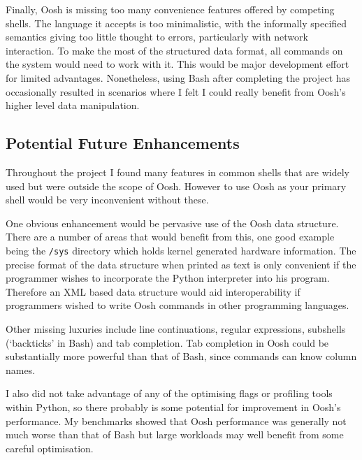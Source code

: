 \documentclass[12pt,twoside,notitlepage]{report}
\begin{document}
Finally, Oosh is missing too many convenience features offered by
competing shells. The language it accepts is too minimalistic, with
the informally specified semantics giving too little thought to
errors, particularly with network interaction. To make the most of the
structured data format, all commands on the system would need to work
with it. This would be major development effort for limited
advantages. Nonetheless, using Bash after completing the project has
occasionally resulted in scenarios where I felt I could really benefit
from Oosh's higher level data manipulation.

\subsection{Potential Future Enhancements}
Throughout the project I found many features in common shells that are
widely used but were outside the scope of Oosh. However to use Oosh as
your primary shell would be very inconvenient without these.

One obvious enhancement would be pervasive use of the Oosh data
structure. There are a number of areas that would benefit from this,
one good example being the {\tt /sys} directory which holds kernel
generated hardware information. The precise format of the data
structure when printed as text is only convenient if the programmer
wishes to incorporate the Python interpreter into his
program. Therefore an XML based data structure would aid
interoperability if programmers wished to write Oosh commands in other
programming languages.

Other missing luxuries include line continuations, regular
expressions, subshells (`backticks' in Bash) and tab completion. Tab
completion in Oosh could be substantially more powerful than that of
Bash, since commands can know column names.

I also did not take advantage of any of the optimising flags or
profiling tools within Python, so there probably is some potential for
improvement in Oosh's performance. My benchmarks showed that Oosh
performance was generally not much worse than that of Bash but large
workloads may well benefit from some careful optimisation.


\cleardoublepage

\end{document}
